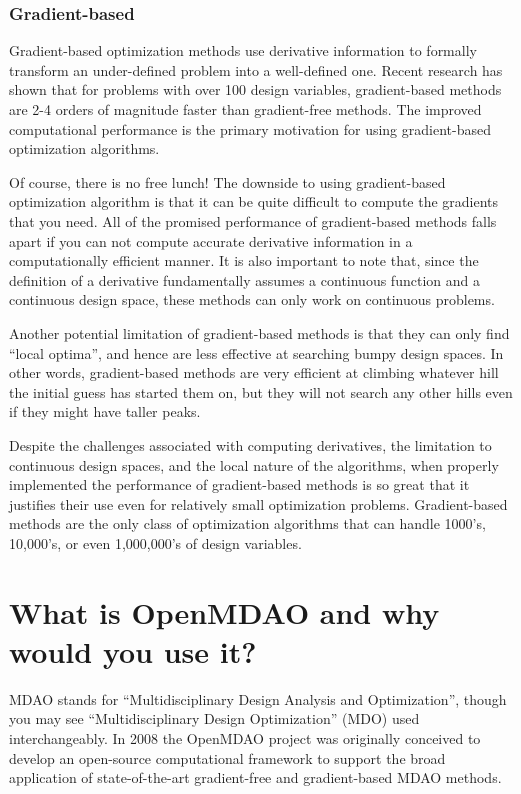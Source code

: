 \documentclass[conf]{new-aiaa}
\begin{document}
        \subsubsection{Gradient-based}

            Gradient-based optimization methods use derivative information to formally transform an under-defined problem into a well-defined one.  
            Recent research has shown that for problems with over 100 design variables, gradient-based methods are 2-4 orders of magnitude faster than gradient-free methods. 
            The improved computational performance is the primary motivation for using gradient-based optimization algorithms. 
            
            Of course, there is no free lunch! The downside to using gradient-based optimization algorithm is that it can be quite difficult to compute the gradients that you need. 
            All of the promised performance of gradient-based methods falls apart if you can not compute accurate derivative information in a computationally efficient manner. 
            It is also important to note that, since the definition of a derivative fundamentally assumes a continuous function and a continuous design space, these methods can only work on continuous problems. 

            Another potential limitation of gradient-based methods is that they can only find ``local optima'', and hence are less effective at searching bumpy design spaces. 
            In other words, gradient-based methods are very efficient at climbing whatever hill the initial guess has started them on, but they will not search any other hills even if they might have taller peaks. 

            Despite the challenges associated with computing derivatives, the limitation to continuous design spaces, and the local nature of the algorithms, when properly implemented the performance of gradient-based methods is so great that it justifies their use even for relatively small optimization problems. 
            Gradient-based methods are the only class of optimization algorithms that can handle 1000's, 10,000's, or even 1,000,000's of design variables. 

\section{What is OpenMDAO and why would you use it?}

    MDAO stands for ``Multidisciplinary Design Analysis and Optimization'', though you may see ``Multidisciplinary Design Optimization'' (MDO) used interchangeably. 
    In 2008 the OpenMDAO project was originally conceived to develop an open-source computational framework to support the broad application of state-of-the-art gradient-free and gradient-based MDAO methods. 
\end{document}

